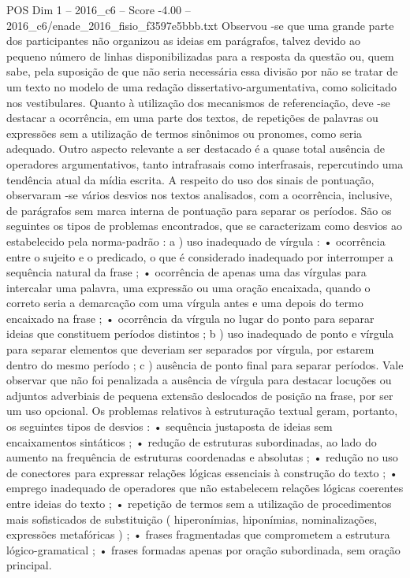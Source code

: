 \begin{textsample}{POS Dim 1 – 2016\_c6 – Score -4.00 – 2016\_c6/enade\_2016\_fisio\_f3597e5bbb.txt}
Observou -se que uma grande parte dos participantes não organizou as ideias em parágrafos, talvez devido ao pequeno número de linhas disponibilizadas para a resposta da questão ou, quem sabe, pela suposição de que não seria necessária essa divisão por não se tratar de um texto no modelo de uma redação dissertativo-argumentativa, como solicitado nos vestibulares.
Quanto à utilização dos mecanismos de referenciação, deve -se destacar a ocorrência, em uma parte dos textos, de repetições de palavras ou expressões sem a utilização de termos sinônimos ou pronomes, como seria adequado.
Outro aspecto relevante a ser destacado é a quase total ausência de operadores argumentativos, tanto intrafrasais como interfrasais, repercutindo uma tendência atual da mídia escrita.
A respeito do uso dos sinais de pontuação, observaram -se vários desvios nos textos analisados, com a ocorrência, inclusive, de parágrafos sem marca interna de pontuação para separar os períodos.
São os seguintes os tipos de problemas encontrados, que se caracterizam como desvios ao estabelecido pela norma-padrão : a ) uso inadequado de vírgula : • ocorrência entre o sujeito e o predicado, o que é considerado inadequado por interromper a sequência natural da frase ; • ocorrência de apenas uma das vírgulas para intercalar uma palavra, uma expressão ou uma oração encaixada, quando o correto seria a demarcação com uma vírgula antes e uma depois do termo encaixado na frase ; • ocorrência da vírgula no lugar do ponto para separar ideias que constituem períodos distintos ; b ) uso inadequado de ponto e vírgula para separar elementos que deveriam ser separados por vírgula, por estarem dentro do mesmo período ; c ) ausência de ponto final para separar períodos.
Vale observar que não foi penalizada a ausência de vírgula para destacar locuções ou adjuntos adverbiais de pequena extensão deslocados de posição na frase, por ser um uso opcional.
Os problemas relativos à estruturação textual geram, portanto, os seguintes tipos de desvios : • sequência justaposta de ideias sem encaixamentos sintáticos ; • redução de estruturas subordinadas, ao lado do aumento na frequência de estruturas coordenadas e absolutas ; • redução no uso de conectores para expressar relações lógicas essenciais à construção do texto ; • emprego inadequado de operadores que não estabelecem relações lógicas coerentes entre ideias do texto ; • repetição de termos sem a utilização de procedimentos mais sofisticados de substituição ( hiperonímias, hiponímias, nominalizações, expressões metafóricas ) ; • frases fragmentadas que comprometem a estrutura lógico-gramatical ; • frases formadas apenas por oração subordinada, sem oração principal.

\end{textsample}
